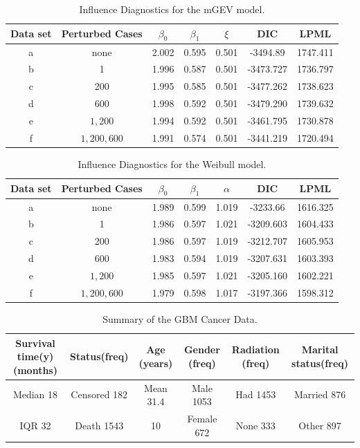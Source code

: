 \documentclass[smallextended]{svjour3}       %
\providecommand{\tabularnewline}{\\}
\begin{document}
{\renewcommand{\arraystretch}{1}
\setlength{\tabcolsep}{6pt}
\begin{table}[!p]
\caption{Influence Diagnostics for the mGEV model.}
\centering{}%
\begin{tabular}{ccccccc}
\hline
Data set & Perturbed Cases & $\beta_0$ & $\beta_1$ & $\xi$ & DIC & LPML \tabularnewline
\hline
a & none & 2.002 & 0.595 & 0.501 & -3494.89 & 1747.411\tabularnewline
b & 1 & 1.996 & 0.587 & 0.501   & -3473.727 & 1736.797\tabularnewline
c & 200 & 1.995 & 0.585 & 0.501 & -3477.262 & 1738.623\tabularnewline
d & 600 & 1.998 & 0.592 & 0.501 & -3479.290 & 1739.632\tabularnewline
e & ${1,200}$ & 1.994 & 0.592 & 0.501 & -3461.795 & 1730.878\tabularnewline
f & ${1,200,600}$ & 1.991 & 0.574 & 0.501 & -3441.219 & 1720.494\tabularnewline
\hline
\end{tabular}
\end{table}

\begin{table}[!p]
\caption{Influence Diagnostics for the Weibull model.}
\centering{}%
\begin{tabular}{ccccccc}
\hline
Data set & Perturbed Cases & $\beta_0$ & $\beta_1$ & $\alpha$ & DIC & LPML \tabularnewline
\hline
\hline
a & none & 1.989 & 0.599 & 1.019 & -3233.66 & 1616.325\tabularnewline
b & 1 & 1.986 & 0.597 & 1.021   & -3209.603 & 1604.433\tabularnewline
c & 200 & 1.986 & 0.597 & 1.019 & -3212.707 & 1605.953\tabularnewline
d & 600 & 1.983 & 0.594 & 1.019 & -3207.631 & 1603.393\tabularnewline
e & ${1,200}$ & 1.985 & 0.597 & 1.021 & -3205.160 & 1602.221\tabularnewline
f & ${1,200,600}$ & 1.979 & 0.598 & 1.017 & -3197.366 & 1598.312\tabularnewline
\hline
\end{tabular}
\end{table}

\begin{table}[!p]
{\small \caption{Summary of the GBM Cancer Data.}
}{\small \par}

{\small \centering{}}%
\begin{tabular}{cccccc}
\hline
\hline
{\small Survival time(y) (months) } & {\small Status(freq) } & {\small Age (years) } & {\small
Gender (freq) } & {\small Radiation (freq) } & {\small Marital status(freq)}\tabularnewline
\hline
{\small Median 18 } & {\small Censored 182 } & {\small Mean 31.4 } & {\small Male 1053 } & {\small
Had 1453 } & {\small Married 876}\tabularnewline
{\small IQR 32 } & {\small Death 1543 } & {\small 10 } & {\small Female 672 } & {\small
None 333 } & {\small Other 897}\tabularnewline
\hline
\end{tabular}
\end{table}

}
\end{document}
